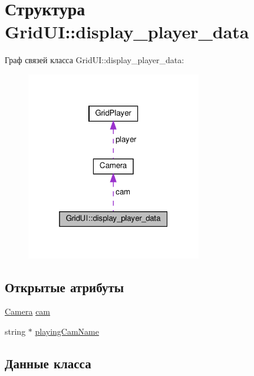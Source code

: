 \hypertarget{struct_grid_u_i_1_1display__player__data}{}\section{Структура Grid\+UI\+:\+:display\+\_\+player\+\_\+data}
\label{struct_grid_u_i_1_1display__player__data}


Граф связей класса Grid\+UI\+:\+:display\+\_\+player\+\_\+data\+:\nopagebreak
\begin{figure}[H]
\begin{center}
\leavevmode
\includegraphics[width=217pt]{struct_grid_u_i_1_1display__player__data__coll__graph}
\end{center}
\end{figure}
\subsection*{Открытые атрибуты}
\begin{DoxyCompactItemize}
\item 
\hyperlink{struct_camera}{Camera} \hyperlink{struct_grid_u_i_1_1display__player__data_aa5e0b51adeac9da58dbf4b1084e7764e}{cam}
\item 
string $\ast$ \hyperlink{struct_grid_u_i_1_1display__player__data_a32f33b258d66863e0ee32137c5d0ec1a}{playing\+Cam\+Name}
\end{DoxyCompactItemize}


\subsection{Данные класса}
\mbox{\label{struct_grid_u_i_1_1display__player__data_aa5e0b51adeac9da58dbf4b1084e7764e}} 
